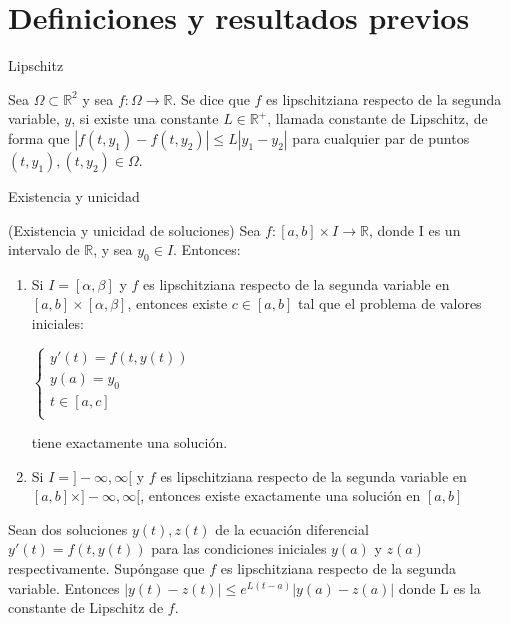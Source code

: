 \section{Definiciones y resultados previos}
		\begin{frame}{Lipschitz}		
			\begin{definition}
				Sea $\Omega \subset \mathbb{R}^2$ y sea $f : \Omega \rightarrow \mathbb{R}$. Se dice que $f$ es lipschitziana respecto de la segunda variable, $y$, si existe una constante $L \in \mathbb{R^{+}}$, llamada constante de Lipschitz, de forma que $|f(t,y_1) - f(t, y_2)| \le L|y_1 - y_2|$ para cualquier par de puntos $(t,y_1), (t,y_2) \in \Omega$.  
			\end{definition}
		\end{frame}
	


		\begin{frame}{Existencia y unicidad}
			\fontsize{11}{11}\selectfont
			\begin{theorem} \label{theorem:existence-uniqueness}
				(Existencia y unicidad de soluciones) Sea $f: [a,b] \times I \rightarrow \mathbb{R}$, donde I es un intervalo de $\mathbb{R}$, y sea $y_0 \in I$. Entonces:
				\begin{enumerate}
					\item Si $I = [\alpha,\beta]$ y $f$ es lipschitziana respecto de la segunda variable en $[a,b]\times[\alpha,\beta]$, entonces existe $c \in [a,b]$ tal que el problema de valores iniciales:
					\begin{center}
						$\begin{cases}
						y'(t) = f(t,y(t)) \\
						y(a) = y_0 \\
						t \in [a,c] \\
						\end{cases}$
					\end{center}
					tiene exactamente una solución.
					\item Si $I = ]-\infty,\infty[$ y $f$ es lipschitziana respecto de la segunda variable en $[a,b]\times]-\infty,\infty[$, entonces existe exactamente una solución en $[a,b]$
				\end{enumerate}
			\end{theorem}
		\end{frame}	
			
		\begin{frame}{}		
				\begin{theorem} \label{theorem:desigualdad-sols}
					Sean dos soluciones $y(t), z(t)$ de la ecuación diferencial $y'(t) = f(t,y(t))$ para las condiciones iniciales $y(a)$ y $z(a)$ respectivamente. Supóngase que $f$ es lipschitziana respecto de la segunda variable. Entonces $|y(t)-z(t)| \leq e^{L(t-a)}|y(a)-z(a)|$ donde L es la constante de Lipschitz de $f$.
				\end{theorem}						
		\end{frame}
				
